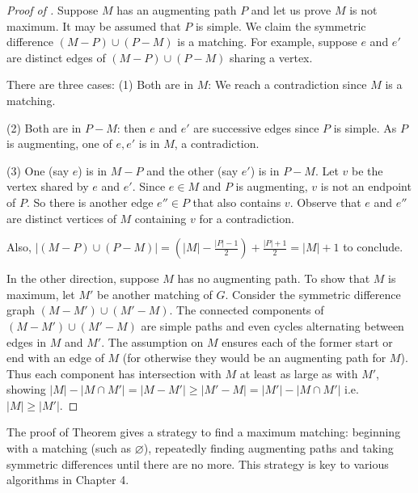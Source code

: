 \begin{center}
\label{fig:berge_example}
\end{center}

\begin{proof}[Proof of ]
Suppose $M$ has an augmenting path $P$ and let us prove $M$ is not maximum. It may be assumed that $P$ is simple.
We claim the symmetric difference $(M - P) \cup (P - M)$ is a matching.
For example, suppose $e$ and $e'$ are distinct edges of $(M - P) \cup (P - M)$ sharing a vertex. 

There are three cases:
(1) Both are in $M$: We reach a contradiction since $M$ is a matching.

(2) Both are in $P - M$: then $e$ and $e'$ are successive edges since $P$ is simple.
As $P$ is augmenting, one of $e, e'$ is in $M$, a contradiction.

(3) One (say $e$) is in $M - P$ and the other (say $e'$) is in $P - M$.
Let $v$ be the vertex shared by $e$ and $e'$.
Since $e \in M$ and $P$ is augmenting, $v$ is not an endpoint of $P$.
So there is another edge $e'' \in P$ that also contains $v$.
Observe that $e$ and $e''$ are distinct vertices of $M$ containing $v$ for a contradiction.

Also, $|(M - P) \cup (P - M)| = (|M| - \frac{|P| - 1}{2}) + \frac{|P| + 1}{2} = |M| + 1$ to conclude.

In the other direction,  suppose $M$ has no augmenting path.
To show that $M$ is maximum, let $M'$ be another matching of $G$.
Consider the symmetric difference graph $(M - M')\cup (M' - M)$.
The connected components of $(M - M')\cup (M' - M)$ are simple paths and even cycles alternating between edges in $M$ and $M'$. The assumption on $M$ ensures each of the former start or end with an edge of $M$ (for otherwise they would be an augmenting path for $M$).
Thus each component has intersection with $M$ at least as large as with $M'$, showing $|M| - |M\cap M'| = |M - M'| \geq |M' - M| = |M'| - |M\cap M'|$ i.e. $|M| \geq |M'|$.
\end{proof}

The proof of Theorem  gives a strategy to find a maximum matching: beginning with a matching (such as $\varnothing$), repeatedly finding augmenting paths and taking symmetric differences until there are no more.
This strategy is key to various algorithms in Chapter 4.